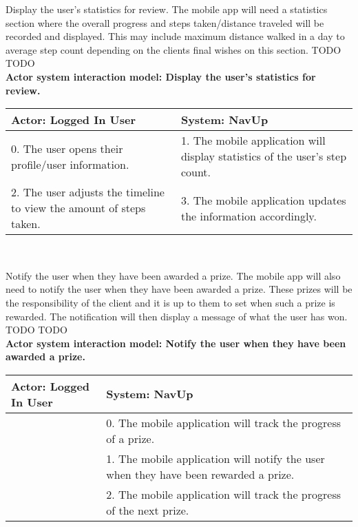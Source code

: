 \FuncReq
{Display the user's statistics for review.}
{The mobile app will need a statistics section where the overall progress and steps taken/distance traveled will be recorded and displayed. This may include maximum distance walked in a day to average step count depending on the clients final wishes on this section.}
{TODO}
{TODO}
\\
\textbf{Actor system interaction model: Display the user's statistics for review. }\\
\begin{tabular}{ | p{6cm} | p{6cm} |}
\hline
Actor: Logged In User & System: NavUp \\ \hline
0. The user opens their profile/user information. & 1. The mobile application will display statistics of the user's step count.\\ \hline
2. The user adjusts the timeline to view the amount of steps taken. & 3. The mobile application updates the information accordingly. \\ \hline
\end{tabular}
\\
\bigskip

\FuncReq
{Notify the user when they have been awarded a prize.}
{The mobile app will also need to notify the user when they have been awarded a prize. These prizes will be the responsibility of the client and it is up to them to set when such a prize is rewarded. The notification will then display a message of what the user has won.}
{TODO}
{TODO}
\\
\textbf{Actor system interaction model: Notify the user when they have been awarded a prize.}\\
\begin{tabular}{ | p{6cm} | p{6cm} |}
\hline
Actor: Logged In User & System: NavUp \\ \hline
& 0. The mobile application will track the progress of a prize.\\ \hline
& 1. The mobile application will notify the user when they have been rewarded a prize.\\ \hline
& 2. The mobile application will track the progress of the next prize.\\ \hline
\end{tabular}
\\
\bigskip

